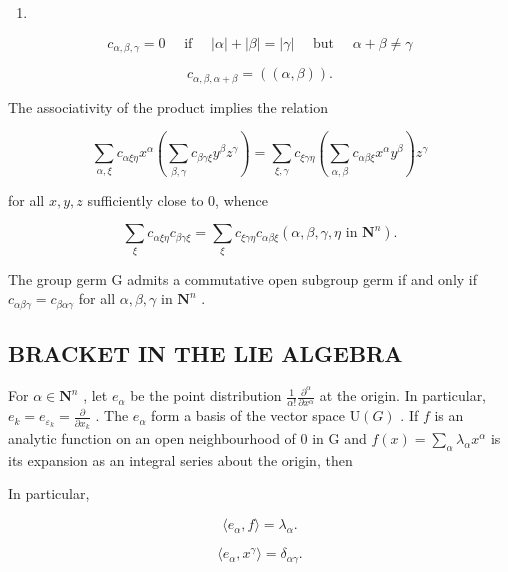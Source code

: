 \begin{enumerate}
\def\labelenumi{(\arabic{enumi})}
\setcounter{enumi}{7}
\tightlist
\item
\end{enumerate}

\[
c _ {\alpha , \beta , \gamma} = 0 \quad \text { if } \quad | \alpha | + | \beta | = | \gamma | \quad \text { but } \quad \alpha + \beta \neq \gamma\tag{8}
\]

\[
c _ {\alpha , \beta , \alpha + \beta} = ((\alpha , \beta)).\tag{9}
\]

The associativity of the product implies the relation

\[
\sum_ {\alpha , \xi} c _ {\alpha \xi \eta} x ^ {\alpha} \left(\sum_ {\beta , \gamma} c _ {\beta \gamma \xi} y ^ {\beta} z ^ {\gamma}\right) = \sum_ {\xi , \gamma} c _ {\xi \gamma \eta} \left(\sum_ {\alpha , \beta} c _ {\alpha \beta \xi} x ^ {\alpha} y ^ {\beta}\right) z ^ {\gamma}
\]

for all \(x, y, z\) sufficiently close to 0, whence

\[
\sum_ {\xi} c _ {\alpha \xi \eta} c _ {\beta \gamma \xi} = \sum_ {\xi} c _ {\xi \gamma \eta} c _ {\alpha \beta \xi} (\alpha , \beta , \gamma , \eta \text { in } \mathbf {N} ^ {n}).\tag{10}
\]

The group germ G admits a commutative open subgroup germ if and only if \(c_{\alpha\beta\gamma} = c_{\beta\alpha\gamma}\) for all \(\alpha, \beta, \gamma\) in \(\mathbf{N}^{n}\) .

\subsection{BRACKET IN THE LIE ALGEBRA}

For \(\alpha \in \mathbf{N}^n\) , let \(e_{\alpha}\) be the point distribution \(\frac{1}{\alpha!} \frac{\partial^{\alpha}}{\partial x^{\alpha}}\) at the origin. In particular, \(e_k = e_{\varepsilon_k} = \frac{\partial}{\partial x_k}\) . The \(e_{\alpha}\) form a basis of the vector space \(\mathrm{U}(G)\) . If \(f\) is an analytic function on an open neighbourhood of 0 in G and \(f(x) = \sum_{\alpha} \lambda_{\alpha} x^{\alpha}\) is its expansion as an integral series about the origin, then

In particular,

\[
\langle e _ {\alpha}, f \rangle = \lambda_ {\alpha}.
\]

\[
\langle e _ {\alpha}, x ^ {\gamma} \rangle = \delta_ {\alpha \gamma}.
\]

